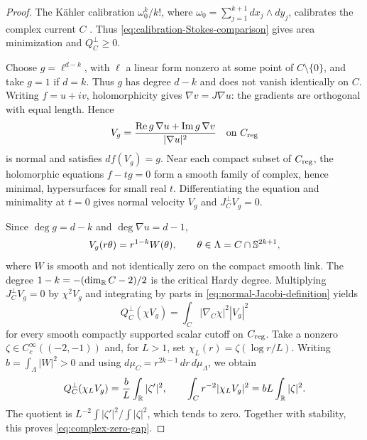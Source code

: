 \begin{proof}
The K\"ahler calibration \(\omega_0^k/k!\), where
\(\omega_0=\sum_{j=1}^{k+1}dx_j\wedge dy_j\), calibrates the complex
current \(C\) \cite{HarveyLawson82a}.  Thus
\eqref{eq:calibration-Stokes-comparison} gives area minimization and
\(Q_C^\perp\geq0\).

Choose \(g=\ell^{d-k}\), with \(\ell\) a linear form nonzero at
some point of \(C\setminus\{0\}\), and take \(g=1\) if \(d=k\).
Thus \(g\) has degree \(d-k\) and does not vanish identically on \(C\).
Writing \(f=u+iv\), holomorphicity gives \(\nabla v=J\nabla u\):
the gradients are orthogonal with equal length. Hence
\begin{equation}\label{eq:complex-critical-Jacobi-field}
 V_g=\frac{\operatorname{Re}g\,\nabla u+
                 \operatorname{Im}g\,\nabla v}{|\nabla u|^2}
 \quad\text{on }C_{\mathrm{reg}}
\end{equation}
is normal and satisfies \(df(V_g)=g\).
Near each compact subset of \(C_{\mathrm{reg}}\), the holomorphic equations
\(f-tg=0\) form a smooth family of complex, hence minimal,
hypersurfaces for small real \(t\). Differentiating the equation and
minimality at \(t=0\) gives normal velocity \(V_g\) and
\(J_C^\perp V_g=0\).

Since \(\deg g=d-k\) and \(\deg\nabla u=d-1\),
\[
 V_g(r\theta)=r^{1-k}W(\theta),\qquad
 \theta\in\Lambda=C\cap\mathbb S^{2k+1},
\]
where \(W\) is smooth and not identically zero on the compact smooth
link. The degree \(1-k=-(\dim_{\mathbb R}C-2)/2\) is the critical Hardy degree.
Multiplying \(J_C^\perp V_g=0\) by \(\chi^2V_g\) and integrating
by parts in \eqref{eq:normal-Jacobi-definition} yields
\begin{equation}\label{eq:normal-Jacobi-cutoff}
 Q_C^\perp(\chi V_g)=\int_C|\nabla_C\chi|^2|V_g|^2
\end{equation}
for every smooth compactly supported scalar cutoff on \(C_{\mathrm{reg}}\).
Take a nonzero \(\zeta\in C_c^\infty((-2,-1))\) and, for \(L>1\), set
\(\chi_L(r)=\zeta(\log r/L)\).  Writing
\(b=\int_\Lambda|W|^2>0\) and using
\(d\mu_C=r^{2k-1}\,dr\,d\mu_\Lambda\), we obtain
\[
 Q_C^\perp(\chi_LV_g)=\frac bL\int_\mathbb R|\zeta'|^2,
 \qquad
 \int_Cr^{-2}|\chi_LV_g|^2=bL\int_\mathbb R|\zeta|^2.
\]
The quotient is
\(L^{-2}\int|\zeta'|^2/\int|\zeta|^2\), which tends to zero.
Together with stability, this proves \eqref{eq:complex-zero-gap}.
\end{proof}

